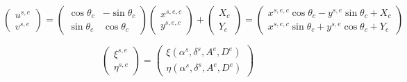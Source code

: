 \documentclass[12pt]{article}
\begin{document}
{\footnotesize

\begin{equation}
\left(
\begin{array}{c}
u^{s,e} \\
v^{s,e} 
\end{array}
\right)
=
\left(
\begin{array}{cc}
\cos \theta_c & -\sin \theta_c \\
\sin \theta_c & \cos \theta_c
\end{array}
\right)
\left(
\begin{array}{c}
x^{s,e,c} \\
y^{s,e,c} 
\end{array}
\right)
+
\left(
\begin{array}{c}
X_c \\
Y_c
\end{array}
\right)
=
\left(
\begin{array}{c}
x^{s,e,c}\cos\theta_c-y^{s,e}\sin\theta_c+X_c \\
x^{s,e,c}\sin\theta_c+y^{s,e}\cos\theta_c+Y_c
\end{array}
\right)
\nonumber
\end{equation}

\begin{equation}
\left(
\begin{array}{c}
\xi^{s,e} \\
\eta^{s,e}
\end{array}
\right)
=
\left(
\begin{array}{c}
\xi(\alpha^{s}, \delta^{s}, A^{e}, D^{e}) \\
\eta(\alpha^{s}, \delta^{s}, A^{e}, D^{e})
\end{array}
\right)
\end{equation}

}
\end{document}
